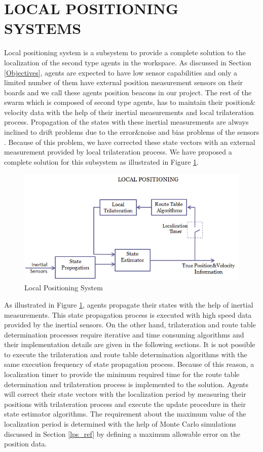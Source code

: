 \section{LOCAL POSITIONING SYSTEMS} \label{LOCAL POSITIONING SYSTEMS_ref}
Local positioning system is a subsystem to provide a complete solution to the localization of the second type agents in the workspace. As discussed in Section \ref{Objectives}, agents are expected to have low sensor capabilities and only a limited number of them have external position measurement sensors on their boards and we call these agents position beacons in our project. The rest of the swarm which is composed of second type agents, has to maintain their position$\&$velocity data with the help of their inertial measurements and local trilateration process. Propagation of the states with these inertial measurements are always inclined to drift problems due to the error$\&$noise and bias problems of the sensors \cite{91}. Because of this problem, we have corrected these state vectors with an external measurement provided by local trilateration process. We have proposed a complete solution for this subsystem as illustrated in Figure \ref{figure_lps}.

\begin{figure}[H]
\caption{Local Positioning System} \label{figure_lps}
\centering
\includegraphics[scale = 0.65]{lps}
\end{figure}

As illustrated in Figure \ref{figure_lps}, agents propagate their states with the help of inertial measurements. This state propagation process is executed with high speed data provided by the inertial sensors. On the other hand, trilateration and route table determination processes require iterative and time consuming algorithms and their implementation details are given in the following sections. It is not possible to execute the trilateration and route table determination algorithms with the same execution frequency of state propagation process. Because of this reason, a localization timer to provide the minimum required time for the route table determination and trilateration process is implemented to the solution. Agents will correct their state vectors with the localization period by measuring their positions with trilateration process and execute the update procedure in their state estimator algorithms. The requirement about the maximum value of the localization period is determined with the help of Monte Carlo simulations discussed in Section \ref{lps_ref} by defining a maximum allowable error on the position data. 

